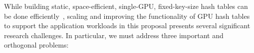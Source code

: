 






While building static, space-efficient, single-GPU, fixed-key-size hash tables can be done efficiently~\cite{Awad:2023:AAI}, scaling and improving the functionality of GPU hash tables to support the application workloads in this proposal presents several significant research challenges. In particular, we must address three important and orthogonal problems:

